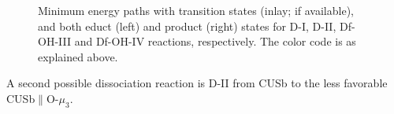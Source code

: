 \documentclass[11pt,DIV=13,BCOR=5mm,a4paper,headinclude]{scrbook}
\begin{document}
\begin{figure} [!h]
\centering
{}
         \quad
{}
 \quad
{}
 \quad
{}
\caption{Minimum energy paths with transition states (inlay; if available), and both educt (left) and product (right) states for D-I, D-II, Df-OH-III and Df-OH-IV reactions, respectively.
The color code is as explained above.}
       \label{mep}
\end{figure}
\clearpage
A second possible dissociation reaction is D-II from CUSb to the less favorable CUSb$\parallel$O-$\mu_3$.
\end{document}
